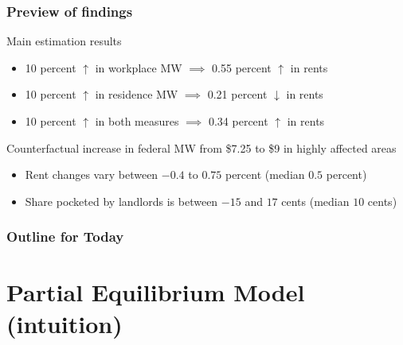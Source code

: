 \documentclass[aspectratio=169, t]{beamer}
\begin{document}
\begin{frame}
    \frametitle{Preview of findings}
    
    Main estimation results
    \begin{itemize}
        \vspace{1mm}
        \item 10 percent $\uparrow$ in {\color{blue} workplace MW}
        $\implies$ 0.55 percent $\uparrow$ in rents
        \vspace{1mm}
        \item 10 percent $\uparrow$ in {\color{red} residence MW}
        $\implies$ 0.21 percent $\downarrow$ in rents
        \vspace{1mm}
        \item 10 percent $\uparrow$ in both measures $\implies$ 0.34 percent $\uparrow$ in rents
    \end{itemize}
    
    \vspace{5mm}
    \pause
    Counterfactual increase in federal MW from \$7.25 to \$9 in highly affected areas
    \begin{itemize}
        \vspace{1mm}
        \item Rent changes vary between $-0.4$ to $0.75$ percent (median $0.5$ percent)
        \vspace{1mm}
        \item Share pocketed by landlords is between $-15$ and $17$ cents (median $10$ cents)
    \end{itemize}
\end{frame}

\begin{frame}
    \frametitle{Outline for Today}
    \tableofcontents[hideallsubsections]
\end{frame}

\section{Partial Equilibrium Model (intuition)}
\end{document}
